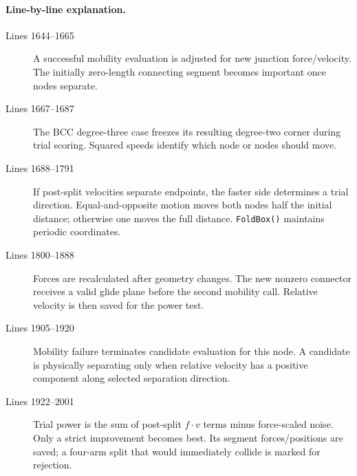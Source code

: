 \documentclass[11pt]{article}
\newcommand{\code}[1]{\texorpdfstring{\nolinkurl{#1}}{#1}}
\begin{document}


\paragraph{Line-by-line explanation.}
\begin{description}
\item[Lines 1644--1665] A successful mobility evaluation is adjusted for new
junction force/velocity. The initially zero-length connecting segment becomes
important once nodes separate.
\item[Lines 1667--1687] The BCC degree-three case freezes its resulting
degree-two corner during trial scoring. Squared speeds identify which node or
nodes should move.
\item[Lines 1688--1791] If post-split velocities separate endpoints, the
faster side determines a trial direction. Equal-and-opposite motion moves
both nodes half the initial distance; otherwise one moves the full distance.
\code{FoldBox()} maintains periodic coordinates.
\item[Lines 1800--1888] Forces are recalculated after geometry changes. The
new nonzero connector receives a valid glide plane before the second mobility
call. Relative velocity is then saved for the power test.
\item[Lines 1905--1920] Mobility failure terminates candidate evaluation for
this node. A candidate is physically separating only when relative velocity
has a positive component along selected separation direction.
\item[Lines 1922--2001] Trial power is the sum of post-split
\(f\mathbin{\cdot}v\) terms minus force-scaled noise. Only a strict
improvement becomes best. Its segment forces/positions are saved; a four-arm
split that would immediately collide is marked for rejection.
\end{description}


\end{document}
